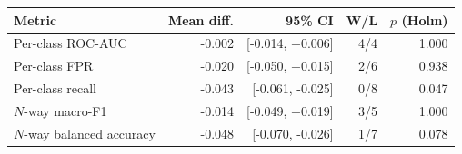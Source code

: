 \begin{tabular}{lrrrr}
\toprule
Metric & Mean diff. & 95\% CI & W/L & $p$ (Holm) \\
\midrule
Per-class ROC-AUC & -0.002 & [-0.014, +0.006] & 4/4 & 1.000 \\
Per-class FPR & -0.020 & [-0.050, +0.015] & 2/6 & 0.938 \\
Per-class recall & -0.043 & [-0.061, -0.025] & 0/8 & 0.047 \\
$N$-way macro-F1 & -0.014 & [-0.049, +0.019] & 3/5 & 1.000 \\
$N$-way balanced accuracy & -0.048 & [-0.070, -0.026] & 1/7 & 0.078 \\
\bottomrule
\end{tabular}
